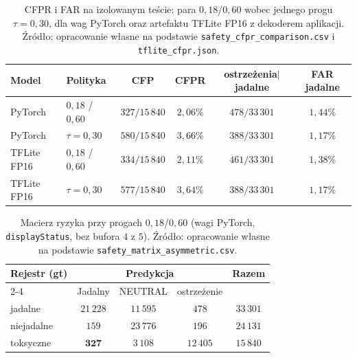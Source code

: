 \begin{table}[htbp]
 \centering
 \caption{CFPR i FAR na izolowanym teście: para $0{,}18$/$0{,}60$ wobec jednego progu $\tau=0{,}30$, dla wag PyTorch oraz artefaktu TFLite FP16 z dekoderem aplikacji. Źródło: opracowanie własne na podstawie \texttt{safety\_cfpr\_comparison.csv} i \texttt{tflite\_cfpr.json}.}
 \label{tab:cfpr_porownanie}
 \begin{tabular}{|l|l|c|c|c|c|}
 \hline
 \textbf{Model} & \textbf{Polityka} & \textbf{CFP} & \textbf{CFPR} & \textbf{ostrzeżenia$\mid$jadalne} & \textbf{FAR jadalne} \\
 \hline \hline
 PyTorch & $0{,}18$ / $0{,}60$ & $327/15\,840$ & $2{,}06\%$ & $478/33\,301$ & $1{,}44\%$ \\
 \hline
 PyTorch & $\tau=0{,}30$ & $580/15\,840$ & $3{,}66\%$ & $388/33\,301$ & $1{,}17\%$ \\
 \hline \hline
 TFLite FP16 & $0{,}18$ / $0{,}60$ & $334/15\,840$ & $2{,}11\%$ & $461/33\,301$ & $1{,}38\%$ \\
 \hline
 TFLite FP16 & $\tau=0{,}30$ & $577/15\,840$ & $3{,}64\%$ & $388/33\,301$ & $1{,}17\%$ \\
 \hline
 \end{tabular}
\end{table}

\begin{table}[htbp]
 \centering
 \caption{Macierz ryzyka przy progach $0{,}18$/$0{,}60$ (wagi PyTorch, \texttt{displayStatus}, bez bufora $4$ z $5$). Źródło: opracowanie własne na podstawie \texttt{safety\_matrix\_asymmetric.csv}.}
 \label{tab:macierz_ryzyka}
 \begin{tabular}{|l|c|c|c|c|}
 \hline
 \multirow{2}{*}{\textbf{Rejestr (gt)}} & \multicolumn{3}{c|}{\textbf{Predykcja}} & \multirow{2}{*}{\textbf{Razem}} \\
 \cline{2-4}
 & Jadalny & NEUTRAL & ostrzeżenie & \\
 \hline \hline
 jadalne & $21\,228$ & $11\,595$ & $478$ & $33\,301$ \\
 \hline
 niejadalne & $159$ & $23\,776$ & $196$ & $24\,131$ \\
 \hline
 toksyczne & $\mathbf{327}$ & $3\,108$ & $12\,405$ & $15\,840$ \\
 \hline
 \end{tabular}
\end{table}

